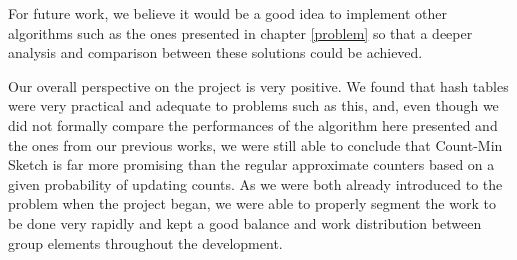 \documentclass[shortpaper]{revdetua}
\begin{document}
For future work, we believe it would be a good idea to implement other algorithms such as the ones presented in chapter \ref{problem} so that a deeper analysis 
and comparison between these solutions could be achieved.

Our overall perspective on the project is very positive.
We found that hash tables were very practical and adequate to problems such as this, and, even though we did not formally compare the performances of the 
algorithm here presented and the ones from our previous works, we were still able to conclude that Count-Min Sketch is far more promising than the regular 
approximate counters based on a given probability of updating counts.
As we were both already introduced to the problem when the project began, we were able to properly segment the work to be done very rapidly and kept a good 
balance and work distribution between group elements throughout the development.


 

\clearpage
\appendix
\end{document}

